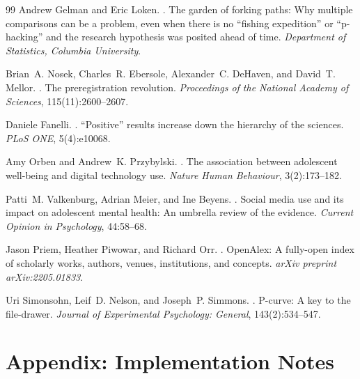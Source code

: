 \begin{thebibliography}{99}
Andrew Gelman and Eric Loken.
.
\newblock The garden of forking paths: Why multiple comparisons can be a
problem, even when there is no ``fishing expedition'' or ``p-hacking'' and
the research hypothesis was posited ahead of time.
\newblock \emph{Department of Statistics, Columbia University}.

Brian~A. Nosek, Charles~R. Ebersole, Alexander~C. DeHaven, and David~T.
Mellor.
.
\newblock The preregistration revolution.
\newblock \emph{Proceedings of the National Academy of Sciences},
115(11):2600--2607.

Daniele Fanelli.
.
\newblock ``Positive'' results increase down the hierarchy of the sciences.
\newblock \emph{PLoS ONE}, 5(4):e10068.

Amy Orben and Andrew~K. Przybylski.
.
\newblock The association between adolescent well-being and digital
technology use.
\newblock \emph{Nature Human Behaviour}, 3(2):173--182.

Patti~M. Valkenburg, Adrian Meier, and Ine Beyens.
.
\newblock Social media use and its impact on adolescent mental health: An
umbrella review of the evidence.
\newblock \emph{Current Opinion in Psychology}, 44:58--68.

Jason Priem, Heather Piwowar, and Richard Orr.
.
\newblock OpenAlex: A fully-open index of scholarly works, authors,
venues, institutions, and concepts.
\newblock \emph{arXiv preprint arXiv:2205.01833}.

Uri Simonsohn, Leif~D. Nelson, and Joseph~P. Simmons.
.
\newblock P-curve: A key to the file-drawer.
\newblock \emph{Journal of Experimental Psychology: General},
143(2):534--547.

\end{thebibliography}

\appendix
\section{Appendix: Implementation Notes}

